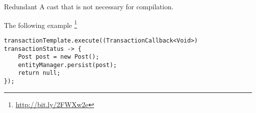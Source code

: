 \begin{pattern}{Redundant}
A cast that is not necessary for compilation.

\instances{}
The following example%
\footnote{\url{http://bit.ly/2FWXw2e}}

\begin{verbatim}
transactionTemplate.execute((TransactionCallback<Void>) transactionStatus -> {
    Post post = new Post();
    entityManager.persist(post);
    return null;
});
\end{verbatim}

\detection{}

\discussion{}

\related{}
    
\end{pattern}
